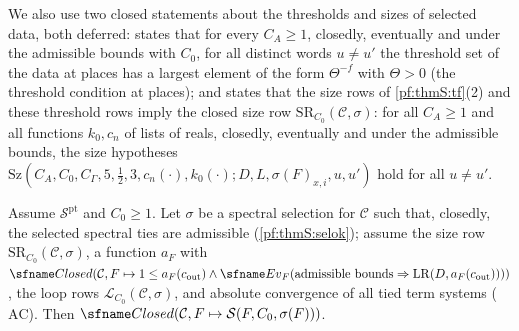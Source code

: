 We also use two closed statements about the thresholds and sizes of selected data, both deferred:
 states that for every $C_A\ge1$, closedly, eventually and
under the admissible bounds with $C_0$, for all distinct words $u\ne u'$ the threshold set of the data at places has
a largest element of the form $\Theta^{-f}$ with $\Theta>0$ (the threshold condition at places); and
 states that the size rows of \cref{pf:thmS:tf}(2) and these
threshold rows imply the closed size row $\mathrm{SR}_{C_0}(\mathcal C,\sigma)$: for all $C_A\ge1$ and all
functions $k_0,c_n$ of lists of reals, closedly, eventually and under the admissible bounds, the size hypotheses
$\mathrm{Sz}(C_A,C_0,C_\Gamma,5,\tfrac12,3,c_n(\cdot),k_0(\cdot);D,L,\sigma(F)_{x,i},u,u')$ hold for all $u\ne u'$.

\begin{proposition}\label{pf:thmS:transport}
Assume $\mathcal{S}^{\mathrm{pt}}$ and $C_0\ge1$. Let $\sigma$ be a spectral selection for $\mathcal C$ such that,
closedly, the selected spectral ties are admissible (\cref{pf:thmS:selok}); assume the size row
$\mathrm{SR}_{C_0}(\mathcal C,\sigma)$, a function $a_F$ with $\thmSClosed(\mathcal C,F\mapsto 1\le
a_F(c_{\mathrm{out}})\wedge\thmSEv_F(\text{admissible bounds}\Rightarrow\mathrm{LR}(D,a_F(c_{\mathrm{out}}))))$, the
loop rows $\mathcal{L}_{C_0}(\mathcal C,\sigma)$, and absolute convergence of all tied term systems
($\mathrm{AC}$). Then $\thmSClosed(\mathcal C,F\mapsto\mathcal{S}(F,C_0,\sigma(F)))$.
\end{proposition}

